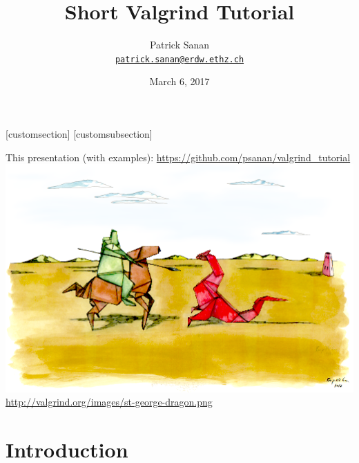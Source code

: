 \documentclass{beamer}
\author[Patrick Sanan]{Patrick Sanan \\ \href{mailto:patrick.sanan@erdw.ethz.ch}{\texttt{patrick.sanan@erdw.ethz.ch}}}
\title[]{Short Valgrind Tutorial}
\date[]{March 6, 2017}
\begin{document}
[customsection]
[customsubsection]


\begin{frame}[fragile]
\titlepage 
\begin{center}
This presentation (with examples): \url{https://github.com/psanan/valgrind_tutorial} \\
\includegraphics[height=0.25\textheight]{st-george-dragon.png}\\
{\tiny \url{http://valgrind.org/images/st-george-dragon.png}}
\end{center}
\end{frame}

\section{Introduction}
\end{document}
